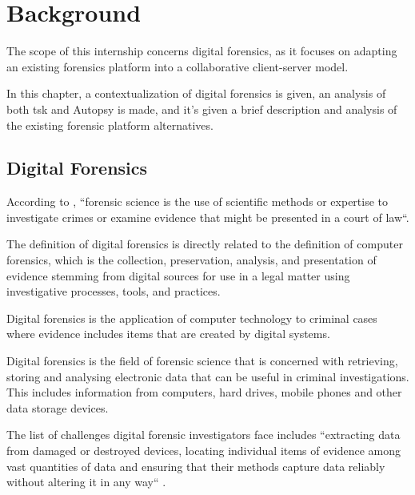 
\chapter{Background}
\label{ch:background}

The scope of this internship concerns digital forensics, as it focuses on adapting an existing forensics platform into a collaborative client-server model.

In this chapter, a contextualization of digital forensics is given, an analysis of both \acrfull{tsk} \cite{sleuthkit} and Autopsy is made, and it's given a brief description and analysis of the existing forensic platform alternatives.

\section{Digital Forensics}

According to \citeauthor{nist} \cite{nist}, ``forensic science is the use of scientific methods or expertise to investigate crimes
or examine evidence that might be presented in a court of law``.

The definition of digital forensics is directly related to the definition of
computer forensics, which is the collection, preservation, analysis,
and presentation \cite{daniels} of evidence stemming from digital sources for use in a legal matter
using investigative processes, tools, and practices.

Digital forensics \cite{nist2} is the application of computer technology to criminal cases where evidence
includes items that are created by digital systems.

Digital forensics is the field of forensic science that is concerned with retrieving,
storing and analysing electronic data that can be useful in criminal investigations.
This includes information from computers, hard drives, mobile phones and other data
storage devices.

The list of challenges digital forensic investigators face includes ``extracting data from damaged or destroyed
devices, locating individual items of evidence among vast quantities of data
and ensuring that their methods capture data reliably without altering it in any way`` \cite{nist2}.

